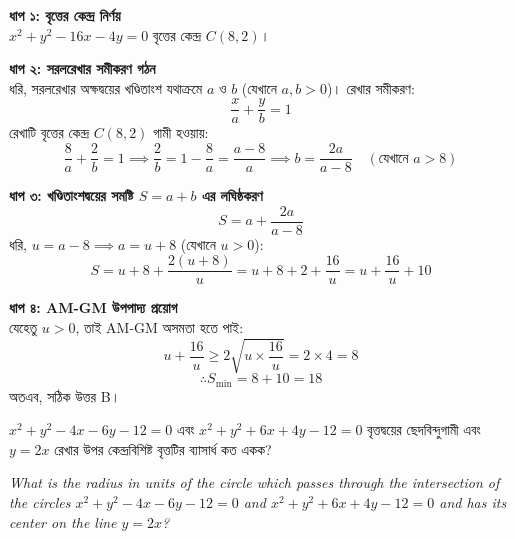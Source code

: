 \documentclass[12pt, a4paper]{article}
\begin{document}
\begin{tcolorbox}[solutionbox={সমাধান (Solution)}]
    \noindent
    \textbf{ধাপ ১: বৃত্তের কেন্দ্র নির্ণয়} \\
    $x^2 + y^2 - 16x - 4y = 0$ বৃত্তের কেন্দ্র $C(8, 2)$।
    
    \vspace{0.5em}
    \noindent\textbf{ধাপ ২: সরলরেখার সমীকরণ গঠন} \\
    ধরি, সরলরেখার অক্ষদ্বয়ের খণ্ডিতাংশ যথাক্রমে $a$ ও $b$ (যেখানে $a, b > 0$)। 
    রেখার সমীকরণ:
    \[ \frac{x}{a} + \frac{y}{b} = 1 \]
    রেখাটি বৃত্তের কেন্দ্র $C(8, 2)$ গামী হওয়ায়:
    \[ \frac{8}{a} + \frac{2}{b} = 1 \implies \frac{2}{b} = 1 - \frac{8}{a} = \frac{a - 8}{a} \implies b = \frac{2a}{a - 8} \quad (\text{যেখানে } a > 8) \]
    
    \vspace{0.5em}
    \noindent\textbf{ধাপ ৩: খণ্ডিতাংশদ্বয়ের সমষ্টি $S = a + b$ এর লঘিষ্ঠকরণ} \\
    \[ S = a + \frac{2a}{a - 8} \]
    ধরি, $u = a - 8 \implies a = u + 8$ (যেখানে $u > 0$):
    \[ S = u + 8 + \frac{2(u + 8)}{u} = u + 8 + 2 + \frac{16}{u} = u + \frac{16}{u} + 10 \]
    
    \vspace{0.5em}
    \noindent\textbf{ধাপ ৪: AM-GM উপপাদ্য প্রয়োগ} \\
    যেহেতু $u > 0$, তাই AM-GM অসমতা হতে পাই:
    \[ u + \frac{16}{u} \ge 2\sqrt{u \times \frac{16}{u}} = 2 \times 4 = 8 \]
    \[ \therefore S_{\min} = 8 + 10 = 18 \]
    অতএব, সঠিক উত্তর B।
\end{tcolorbox}
\begin{tcolorbox}[questionbox={প্রশ্ন (Question) 9}]
    \noindent
    $x^2 + y^2 - 4x - 6y - 12 = 0$ এবং $x^2 + y^2 + 6x + 4y - 12 = 0$ বৃত্তদ্বয়ের ছেদবিন্দুগামী এবং $y = 2x$ রেখার উপর কেন্দ্রবিশিষ্ট বৃত্তটির ব্যাসার্ধ কত একক?
    
    \vspace{0.8em}
    \begin{english}
    \noindent\textit{\color{darkgray}
    What is the radius in units of the circle which passes through the intersection of the circles $x^2 + y^2 - 4x - 6y - 12 = 0$ and $x^2 + y^2 + 6x + 4y - 12 = 0$ and has its center on the line $y = 2x$?
    }
    \end{english}
\end{tcolorbox}
\end{document}

